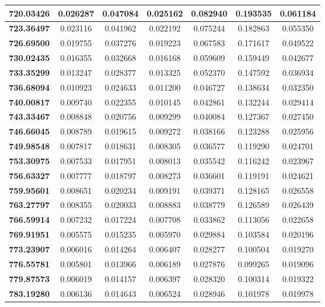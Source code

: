 \documentclass[11pt]{article}
\begin{document}
\begin{appendices}
\begin{longtable}{|c|c|c|c|c|c|c|}
	\textbf{720.03426} & 0.026287 & 0.047084 & 0.025162 & 0.082940 & 0.193535 & 0.061184 \\ \hline
	\textbf{723.36497} & 0.023116 & 0.041962 & 0.022192 & 0.075244 & 0.182863 & 0.055350 \\ \hline
	\textbf{726.69500} & 0.019755 & 0.037276 & 0.019223 & 0.067583 & 0.171617 & 0.049522 \\ \hline
	\textbf{730.02435} & 0.016355 & 0.032668 & 0.016168 & 0.059609 & 0.159449 & 0.042677 \\ \hline
	\textbf{733.35299} & 0.013247 & 0.028377 & 0.013325 & 0.052370 & 0.147592 & 0.036934 \\ \hline
	\textbf{736.68094} & 0.010923 & 0.024633 & 0.011200 & 0.046727 & 0.138634 & 0.032350 \\ \hline
	\textbf{740.00817} & 0.009740 & 0.022355 & 0.010145 & 0.042861 & 0.132244 & 0.029414 \\ \hline
	\textbf{743.33467} & 0.008848 & 0.020756 & 0.009299 & 0.040084 & 0.127367 & 0.027450 \\ \hline
	\textbf{746.66045} & 0.008789 & 0.019615 & 0.009272 & 0.038166 & 0.123288 & 0.025956 \\ \hline
	\textbf{749.98548} & 0.007817 & 0.018631 & 0.008305 & 0.036577 & 0.119290 & 0.024701 \\ \hline
	\textbf{753.30975} & 0.007533 & 0.017951 & 0.008013 & 0.035542 & 0.116242 & 0.023967 \\ \hline
	\textbf{756.63327} & 0.007777 & 0.018797 & 0.008273 & 0.036601 & 0.119191 & 0.024621 \\ \hline
	\textbf{759.95601} & 0.008651 & 0.020234 & 0.009191 & 0.039371 & 0.128165 & 0.026558 \\ \hline
	\textbf{763.27797} & 0.008355 & 0.020033 & 0.008883 & 0.038779 & 0.126589 & 0.026439 \\ \hline
	\textbf{766.59914} & 0.007232 & 0.017224 & 0.007708 & 0.033862 & 0.113056 & 0.022658 \\ \hline
	\textbf{769.91951} & 0.005575 & 0.015235 & 0.005970 & 0.029884 & 0.103584 & 0.020196 \\ \hline
	\textbf{773.23907} & 0.006016 & 0.014264 & 0.006407 & 0.028277 & 0.100504 & 0.019270 \\ \hline
	\textbf{776.55781} & 0.005801 & 0.013966 & 0.006189 & 0.027876 & 0.099265 & 0.019096 \\ \hline
	\textbf{779.87573} & 0.006019 & 0.014157 & 0.006397 & 0.028320 & 0.100314 & 0.019322 \\ \hline
	\textbf{783.19280} & 0.006136 & 0.014643 & 0.006524 & 0.028946 & 0.101978 & 0.019978 \\ \hline

\end{longtable}
\end{appendices}
\end{document}
